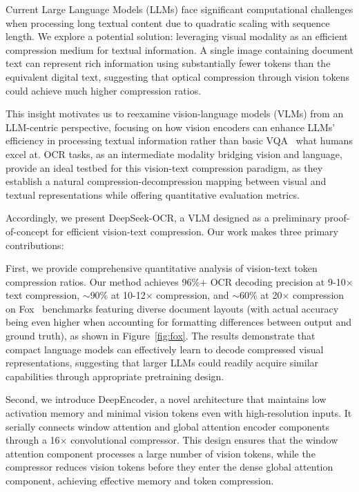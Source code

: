 \documentclass[11pt, a4paper, logo, copyright, nonumbering]{deepseek}
\begin{document}
\begin{CJK*}{UTF8}{gbsn}


Current Large Language Models (LLMs) face significant computational challenges when processing long textual content due to quadratic scaling with sequence length. We explore a potential solution: leveraging visual modality as an efficient compression medium for textual information. A single image containing document text can represent rich information using substantially fewer tokens than the equivalent digital text, suggesting that optical compression through vision tokens could achieve much higher compression ratios.

This insight motivates us to reexamine vision-language models (VLMs) from an LLM-centric perspective, focusing on how vision encoders can enhance LLMs' efficiency in processing textual information rather than basic VQA~\cite{goyal2017making,masry2022chartqa,TextVQA,yu2023mm,kazemzadeh2014referitgame} what humans excel at. OCR tasks, as an intermediate modality bridging vision and language,  provide an ideal testbed for this vision-text compression paradigm, as they establish a natural compression-decompression mapping between visual and textual representations while offering quantitative evaluation metrics.

Accordingly, we present DeepSeek-OCR, a VLM designed as a preliminary proof-of-concept for efficient vision-text compression. Our work makes three primary contributions:


First, we provide comprehensive quantitative analysis of vision-text token compression ratios. Our method achieves 96\%+ OCR decoding precision at 9-10$\times$ text compression, $\sim$90\% at 10-12$\times$ compression, and $\sim$60\% at 20$\times$ compression on Fox~\cite{liu2024focus_fox} benchmarks featuring diverse document layouts (with actual accuracy being even higher when accounting for formatting differences between output and ground truth), as shown in Figure~\ref{fig:fox}. The results demonstrate that compact language models can effectively learn to decode compressed visual representations, suggesting that larger LLMs could readily acquire similar capabilities through appropriate pretraining design.

Second, we introduce DeepEncoder, a novel architecture that maintains low activation memory and minimal vision tokens even with high-resolution inputs. It serially connects window attention and global attention encoder components through a 16$\times$ convolutional compressor. This design ensures that the window attention component processes a large number of vision tokens, while the compressor reduces vision tokens before they enter the dense global attention component, achieving effective memory and token compression.


\end{CJK*}
\end{document}

